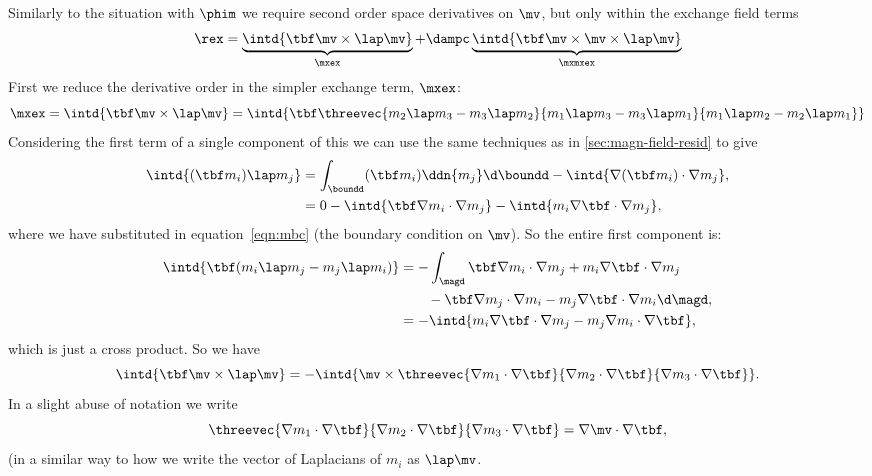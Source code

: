 Similarly to the situation with $\phim$ we require second order space derivatives on $\mv$, but only within the exchange field terms
\begin{equation}
  \rex = \underbrace{\intd{\tbf \mv \times \lap \mv}}_{\mxex}
  + \dampc \underbrace{\intd{\tbf \mv \times \mv \times \lap \mv}}_{\mxmxex}
  \label{ll-eqn:exresterms}
\end{equation}
First we reduce the derivative order in the simpler exchange term, $\mxex$:
\begin{equation}
  \mxex =
  \intd{\tbf \mv \times \lap \mv} =
  \intd{\tbf \threevec{m_2 \lap m_3 - m_3 \lap m_2 }
      {m_1 \lap m_3 - m_3 \lap m_1 }
      {m_1 \lap m_2 - m_2 \lap m_1 }}
 
\end{equation}
Considering the first term of a single component of this we can use the same techniques as in \cref{sec:magn-field-resid} to give
\begin{equation}
\begin{aligned}
  \intd{(\tbf m_i) \lap m_j}
  &= \int_\boundd (\tbf m_i) \ddn{m_j} \d\boundd
  - \intd{\nabla(\tbf m_i) \cdot \nabla m_j}, \\
  &= 0 - \intd{\tbf \nabla m_i \cdot \nabla m_j}
  -  \intd{m_i \nabla \tbf \cdot \nabla m_j},
\end{aligned}
\end{equation}
where we have substituted in equation~\eqref{eqn:mbc} (the boundary condition on $\mv$).
So the entire first component is:
\begin{equation}
  \begin{aligned}
    \intd{\tbf (m_i \lap m_j - m_j \lap m_i)}
    &= - \int_\magd \tbf \nabla m_i \cdot \nabla m_j
    +  m_i \nabla \tbf \cdot \nabla m_j \\
    & \qquad - \tbf \nabla m_j \cdot \nabla m_i
    -  m_j \nabla \tbf \cdot \nabla m_i \d\magd, \\
    &= -\intd{m_i \nabla \tbf \cdot \nabla m_j - m_j \nabla m_i  \cdot \nabla \tbf},
  \end{aligned}
\end{equation}
which is just a cross product.
So we have
\begin{equation}
  \intd{\tbf \mv \times \lap \mv} =
  -\intd{\mv \times \threevec{\nabla m_1 \cdot \nabla \tbf}{\nabla m_2 \cdot \nabla \tbf}{\nabla m_3 \cdot \nabla \tbf}}.
\end{equation}
In a slight abuse of notation we write
\begin{equation}
  \threevec{\nabla m_1 \cdot \nabla \tbf}{\nabla m_2 \cdot \nabla \tbf}{\nabla m_3 \cdot \nabla \tbf} = \nabla \mv \cdot \nabla \tbf,
  \label{ll-eqn:gradvecm}
\end{equation}
(in a similar way to how we write the vector of Laplacians of $m_i$ as $\lap \mv$.

